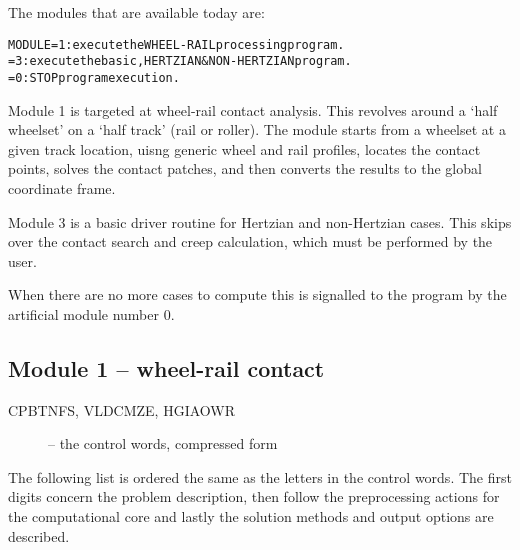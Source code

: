 \documentclass[12pt]{report}
\renewcommand{\magenta}[1]{}
\begin{document}
The modules that are available today are:
\begin{alltt}\small
 MODULE = 1: execute the WHEEL-RAIL processing program.
        = 3: execute the basic, HERTZIAN & NON-HERTZIAN program.
        = 0: STOP program execution.
\end{alltt}
Module 1 is targeted at wheel-rail contact analysis. This revolves around a
`half wheelset' on a `half track' (rail or roller). The module starts
from a wheelset at a given track location, uisng generic wheel and rail
profiles, locates the contact points, solves the contact patches, and then
converts the results to the global coordinate frame. 

Module 3 is a basic driver routine for Hertzian and non-Hertzian cases.
This skips over the contact search and creep calculation, which must be
performed by the user.

When there are no more cases to compute this is signalled to the program by
the artificial module number 0.

\subsection{Module 1 -- wheel-rail contact}

\begin{description}
\item[CPBTNFS, VLDCMZE, \magenta{X}HGIAOWR] -- the control words, compressed form
\end{description}
The following list is ordered the same as the letters in the control words.
The first digits concern the problem description, then follow the
preprocessing actions for the computational core and lastly the solution
methods and output options are described.
\end{document}
